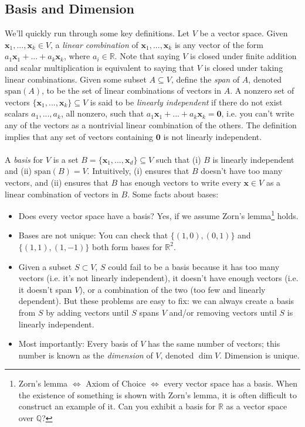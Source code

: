 \documentclass{article}
\newcommand{\R}{\mathbb{R}}
\newcommand{\Q}{\mathbb{Q}}
\newcommand{\tit}{\textit}
\newcommand{\tbf}{\textbf}
\begin{document}
\subsection{Basis and Dimension}
We'll quickly run through some key definitions. Let $V$ be a vector space. Given $\tbf{x}_1, ..., \tbf{x}_k \in V$, a \tit{linear combination} of $\tbf{x}_1, ..., \tbf{x}_k$ is any vector of the form $a_1\tbf{x}_1 + ... + a_k\tbf{x}_k$, where $a_i \in \R$. Note that saying $V$ is closed under finite addition and scalar multiplication is equivalent to saying that $V$ is closed under taking linear combinations. Given some subset $A \subseteq V$, define the \tit{span} of $A$, denoted $\text{span}(A)$, to be the set of linear combinations of vectors in $A$.  A nonzero set of vectors $\{\tbf{x}_1, ... , \tbf{x}_k\} \subseteq V$ is said to be \tit{linearly independent} if there do not exist scalars $a_1, ... ,a_k$, all nonzero, such that $a_1\tbf{x}_1 + ... + a_k\tbf{x}_k = \mathbf{0}$, i.e. you can't write any of the vectors as a nontrivial linear combination of the others. The definition implies that any set of vectors containing $\tbf{0}$ is not linearly independent.
\\ \\
A \tit{basis} for $V$ is a set $B = \{\tbf{x}_1, ... , \tbf{x}_d\} \subseteq V$ such that (i) $B$ is linearly independent and (ii) $\text{span}(B) = V$. Intuitively, (i) ensures that $B$ doesn't have too many vectors, and (ii) ensures that $B$ has enough vectors to write every $\tbf{x} \in V$ as a linear combination of vectors in $B$. Some facts about bases: 
\begin{itemize}
\item Does every vector space have a basis? Yes, if we assume Zorn's lemma\footnote{Zorn's lemma $\iff$ Axiom of Choice $\iff$ every vector space has a basis. When the existence of something is shown with Zorn's lemma, it is often difficult to construct an example of it. Can you exhibit a basis for $\R$ as a vector space over $\Q$?} holds. 
\item Bases are not unique: You can check that $\{(1,0), (0,1)\}$ and $\{(1,1), (1,-1)\}$ both form bases for $\R^2$.
\item Given a subset $S \subset V$, $S$ could fail to be a basis because it has too many vectors (i.e. it's not linearly independent), it doesn't have enough vectors (i.e. it doesn't span $V$), or a combination of the two (too few and linearly dependent). But these problems are easy to fix: we can always create a basis from $S$ by adding vectors until $S$ spans $V$ and/or removing vectors until $S$ is linearly independent. 
\item Most importantly: Every basis of $V$ has the same number of vectors; this number is known as the \tit{dimension} of $V$, denoted $\dim{V}$. Dimension is unique.
\end{itemize}
\end{document}
